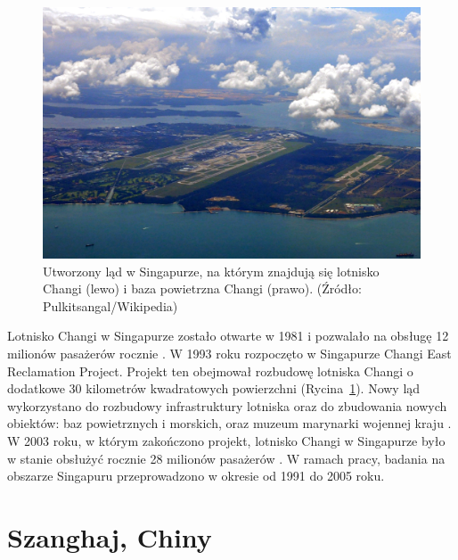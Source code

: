 \documentclass{amuthesis}
\begin{document}
\begin{figure}[t]

{\centering \includegraphics[width=1\textwidth,height=\textheight]{figures/singapore/singapore_aoi.jpeg}

}

\caption{\label{fig-sp_aoi}Utworzony ląd w Singapurze, na którym
znajdują się lotnisko Changi (lewo) i baza powietrzna Changi (prawo).
(Źródło: Pulkitsangal/Wikipedia)}

\end{figure}

Lotnisko Changi w Singapurze zostało otwarte w 1981 i pozwalało na
obsługę 12 milionów pasażerów rocznie \autocite{phang2003strategic}. W
1993 roku rozpoczęto w Singapurze Changi East Reclamation Project.
Projekt ten obejmował rozbudowę lotniska Changi o dodatkowe 30
kilometrów kwadratowych powierzchni (Rycina~\ref{fig-sp_aoi}). Nowy ląd
wykorzystano do rozbudowy infrastruktury lotniska oraz do zbudowania
nowych obiektów: baz powietrznych i morskich, oraz muzeum marynarki
wojennej kraju \autocite{arulrajah2009instrumentation}. W 2003 roku, w
którym zakończono projekt, lotnisko Changi w Singapurze było w stanie
obsłużyć rocznie 28 milionów pasażerów \autocite{phang2003strategic}. W
ramach pracy, badania na obszarze Singapuru przeprowadzono w okresie od
1991 do 2005 roku.

\hypertarget{szanghaj-chiny}{%
\section{Szanghaj, Chiny}\label{szanghaj-chiny}}
\end{document}
